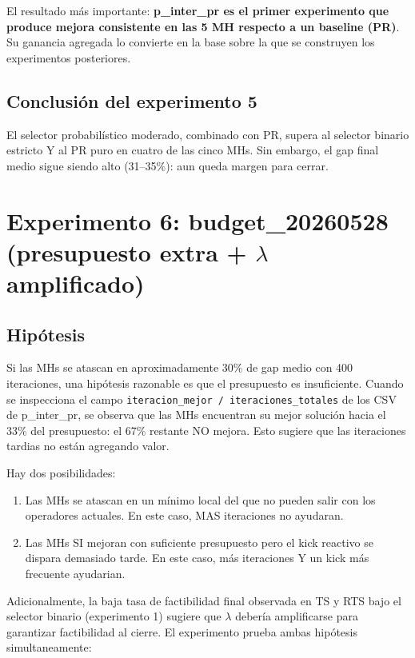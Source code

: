 El resultado más importante: \textbf{p\_inter\_pr es el primer
experimento que produce mejora consistente en las 5 MH respecto a un
baseline (PR)}. Su ganancia agregada lo convierte en la base sobre la
que se construyen los experimentos posteriores.

\subsection{Conclusión del experimento 5}

El selector probabilístico moderado, combinado con PR, supera al
selector binario estricto Y al PR puro en cuatro de las cinco MHs.
Sin embargo, el gap final medio sigue siendo alto (31--35\%): aun
queda margen para cerrar.

\section{Experimento 6: budget\_20260528 (presupuesto extra + $\lambda$ amplificado)}
\label{sec:exp-budget}

\subsection{Hipótesis}

Si las MHs se atascan en aproximadamente 30\% de gap medio con 400
iteraciones, una hipótesis razonable es que el presupuesto es
insuficiente. Cuando se inspecciona el campo
\texttt{iteracion\_mejor / iteraciones\_totales} de los CSV de
p\_inter\_pr, se observa que las MHs encuentran su mejor solución
hacia el 33\% del presupuesto: el 67\% restante NO mejora. Esto
sugiere que las iteraciones tardias no están agregando valor.

Hay dos posibilidades:

\begin{enumerate}
\item Las MHs se atascan en un mínimo local del que no pueden salir
  con los operadores actuales. En este caso, MAS iteraciones no
  ayudaran.
\item Las MHs SI mejoran con suficiente presupuesto pero el kick
  reactivo se dispara demasiado tarde. En este caso, más iteraciones
  Y un kick más frecuente ayudarian.
\end{enumerate}

Adicionalmente, la baja tasa de factibilidad final observada en TS y
RTS bajo el selector binario (experimento 1) sugiere que $\lambda$
debería amplificarse para garantizar factibilidad al cierre. El
experimento prueba ambas hipótesis simultaneamente:

